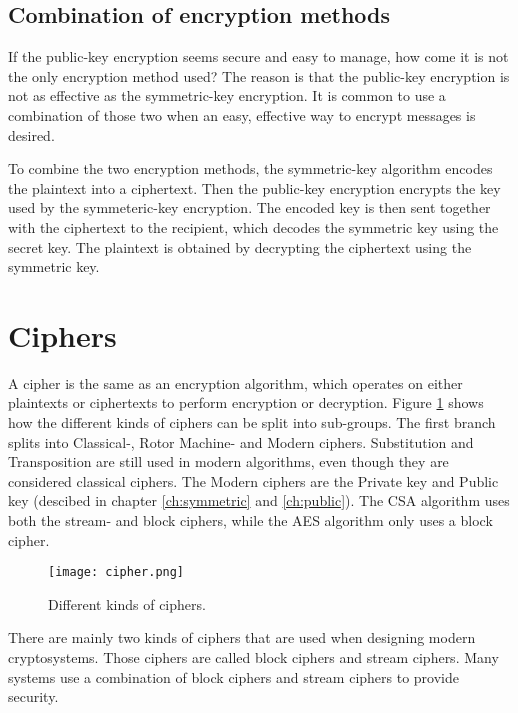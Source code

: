 \subsection{Combination of encryption methods}
If the public-key encryption seems secure and easy to manage, how 
come it is not the only encryption method used? The reason is that the 
public-key encryption is not as effective as the symmetric-key 
encryption. It is common to use a combination of those two when 
an easy, effective way to encrypt messages is desired.

To combine the two encryption methods, the symmetric-key algorithm 
encodes the plaintext into a ciphertext. Then the public-key 
encryption encrypts the key used by the symmeteric-key encryption. The 
encoded key is then sent together with the ciphertext to the 
recipient, which decodes the symmetric key using the secret key. The 
plaintext is obtained by decrypting the ciphertext using the symmetric 
key.


\section{Ciphers}
A cipher is the same as an encryption algorithm, which operates on 
either plaintexts or ciphertexts to perform encryption or decryption. 
Figure \ref{img:ciphers} shows how the different kinds of ciphers 
can be split into sub-groups. The first branch splits into Classical-, 
Rotor Machine- and Modern ciphers. Substitution and Transposition are 
still used in modern algorithms, even though they are considered 
classical ciphers. The Modern ciphers are the Private 
key and Public key (descibed in chapter \ref{ch:symmetric} and 
\ref{ch:public}). The CSA algorithm uses both the stream- and block 
ciphers, while the AES algorithm only uses a block cipher.

\begin{figure}
  \texttt{[image: cipher.png]}
  \caption{Different kinds of ciphers. \citep{CipherTax:2013}}
  \label{img:ciphers}
\end{figure}

There are mainly two kinds of ciphers that are used when designing 
modern cryptosystems. Those ciphers are called block ciphers and 
stream ciphers. Many systems use a combination of block ciphers and 
stream ciphers to provide security. 

